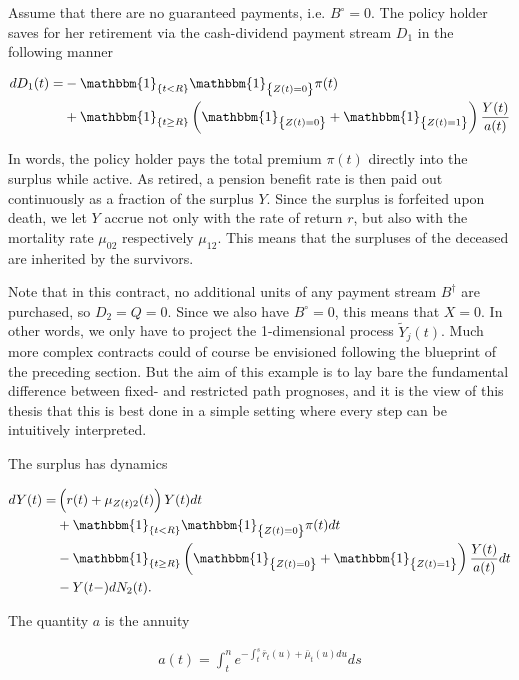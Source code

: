\documentclass{article}
\newcommand{\1}[1]{\mathbbm{1}_{\left\lbrace #1 \right\rbrace}}
\theoremstyle{break}
\theoremstyle{remark}
\numberwithin{equation}{section}
\begin{document}
Assume that there are no guaranteed payments, i.e. $B^\circ=0$. The policy holder saves for her retirement via the cash-dividend payment stream $D_1$ in the following manner

\begin{align*}
	dD_1(t) =& - \1{t<R} \1{Z(t)=0} \pi(t) \\
	&+ \1{t \geq R} \left( \1{Z(t)=0} + \1{Z(t)=1} \right) \frac{Y(t)}{a(t)}
\end{align*}

In words, the policy holder pays the total premium $\pi(t)$ directly into the surplus while active. As retired, a pension benefit rate is then paid out continuously as a fraction of the surplus $Y$. Since the surplus is forfeited upon death, we let $Y$ accrue not only with the rate of return $r$, but also with the mortality rate $\mu_{02}$ respectively $\mu_{12}$. This means that the surpluses of the deceased are inherited by the survivors.

Note that in this contract, no additional units of any payment stream $B^\dagger$ are purchased, so $D_2=Q=0$. Since we also have $B^\circ=0$, this means that $X=0$. In other words, we only have to project the 1-dimensional process $\tilde{Y}_j(t)$. Much more complex contracts could of course be envisioned following the blueprint of the preceding section. But the aim of this example is to lay bare the fundamental difference between fixed- and restricted path prognoses, and it is the view of this thesis that this is best done in a simple setting where every step can be intuitively interpreted.

The surplus has dynamics

\begin{align} \label{YExampleDyn}
\begin{split}
		dY(t) =& \left( r(t) + \mu_{Z(t)2}(t) \right) Y(t) dt \\
	&+ \1{t<R} \1{Z(t)=0} \pi(t) dt \\
	&- \1{t \geq R} \left( \1{Z(t)=0} + \1{Z(t)=1} \right) \frac{Y(t)}{a(t)} dt \\
	&- Y(t-) dN_2(t).
\end{split}
\end{align}

The quantity $a$ is the annuity

\begin{align} \label{Annuity}
	a(t) = \int_t^n e^{-\int_t^s \bar{r}_t(u) + \bar{\mu}_t(u) du} ds
\end{align}
\end{document}
